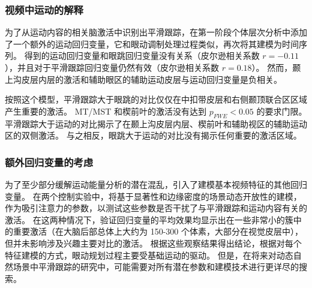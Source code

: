 \subsubsection{视频中运动的解释}
为了从运动内容的相关脑激活中识别出平滑跟踪，在第一阶段个体层次分析中添加了一个额外的运动回归变量，它和眼动调制处理过程类似，再次将其建模为时间序列。
得到的运动回归变量和眼跳回归变量没有关系（皮尔逊相关系数 $r=-0.11$），并且对于平滑跟踪回归变量仍然有效（皮尔逊相关系数 $r=0.18$）。
然而，颞上沟皮层内层的激活和辅助眼区的辅助运动皮层与运动回归变量是负相关。

按照这个模型，平滑跟踪大于眼跳的对比仅仅在中扣带皮层和右侧颞顶联合区区域产生重要的激活。
MT/MST 和楔前叶的激活没有达到 $p_{FWE} < 0.05$ 的要求门限。
%
平滑跟踪大于运动的对比揭示了在颞上沟皮层内层、楔前叶和辅助视区的辅助运动区的双侧激活。
与之相反，眼跳大于运动的对比没有揭示任何重要的激活区域。

\subsubsection{额外回归变量的考虑}
为了至少部分缓解运动能量分析的潜在混乱，引入了建模基本视频特征的其他回归变量。 
在两个控制实验中，将基于显著性和边缘密度的场景动态开放性的建模，作为吸引注意力的参数，以测试这些参数是否干扰了与平滑跟踪和运动内容有关的激活。
在这两种情况下，验证回归变量的平均效果均显示出在一些非常小的簇中的重要激活（在大脑后部总体上大约为 150-300 个体素，大部分在视觉皮层中），但并未影响涉及兴趣主要对比的激活。 
根据这些观察结果得出结论，根据对每个特征建模的方式，眼动规划过程主要受基础运动的驱动。 
但是，在将来对动态自然场景中平滑跟踪的研究中，可能需要对所有潜在参数和建模技术进行更详尽的搜索。


